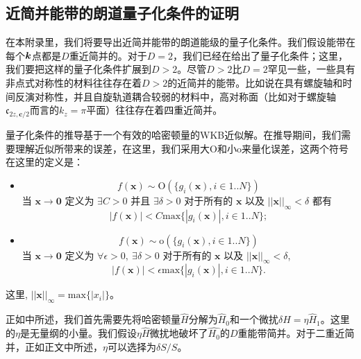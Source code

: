 \begin{appendices}
\chapter{近简并能带的朗道量子化条件的证明}\label{app:quantizationruleproof}

在本附录里，我们将要导出近简并能带的朗道能级的量子化条件。我们假设能带在每个$\boldsymbol{k}$点都是$D$重近简并的。对于$D=2$，我们已经在给出了量子化条件；这里，我们要把这样的量子化条件扩展到$D>2$。尽管$D>2$比$D=2$罕见一些，一些具有非点式对称性的材料往往存在着$D>2$的近简并的能带。比如说在具有螺旋轴和时间反演对称性，并且自旋轨道耦合较弱的材料中，高对称面（比如对于螺旋轴$\mathfrak{c}_{2z,\boldsymbol{c}/2}$而言的$k_z=\pi$平面）往往存在着四重近简并。

量子化条件的推导基于一个有效的哈密顿量的WKB近似解。在推导期间，我们需要理解近似所带来的误差，在这里，我们采用大O和小o来量化误差，这两个符号在这里的定义是： 
\begin{itemize}
    \item 
    \begin{equation}
        f(\boldsymbol{x})\sim\text{O}(\{g_i(\boldsymbol{x}), i\in 1..N\})
    \end{equation}
    当 $\boldsymbol{x}\to\boldsymbol{0}$ 定义为 $\exists C>0$ 并且 $\exists \delta>0$ 对于所有的 $\boldsymbol{x}$ 以及 $||\boldsymbol{x}||_\infty<\delta$ 都有
    \begin{equation}
        |f(\boldsymbol{x})|<C\text{max}\{|g_i(\boldsymbol{x})|, i\in 1..N\};
    \end{equation}
    \item 
    \begin{equation}
        f(\boldsymbol{x})\sim\text{o}(\{g_i(\boldsymbol{x}), i\in 1..N\})
    \end{equation}
    当 $\boldsymbol{x}\to\boldsymbol{0}$ 定义为 $\forall \epsilon>0,~\exists \delta>0$ 对于所有的 $\boldsymbol{x}$ 以及 $||\boldsymbol{x}||_\infty<\delta$,
    \begin{equation}
        |f(\boldsymbol{x})|<\epsilon\text{max}\{|g_i(\boldsymbol{x})|, i\in 1..N\}.
    \end{equation}
\end{itemize}
这里, $||\boldsymbol{x}||_\infty=\text{max}\{|x_i|\}$。

正如中所述，我们首先需要先将哈密顿量$\hat{H}$分解为$\hat{H}_0$和一个微扰$\delta\hat{H}=\eta\hat{H}_1$。这里的$\eta$是无量纲的小量。我们假设$\eta\hat{H}$微扰地破坏了$\hat{H_0}$的$D$重能带简并。对于二重近简并，正如正文中所述，$\eta$可以选择为$\delta S/S$。


\end{appendices}
